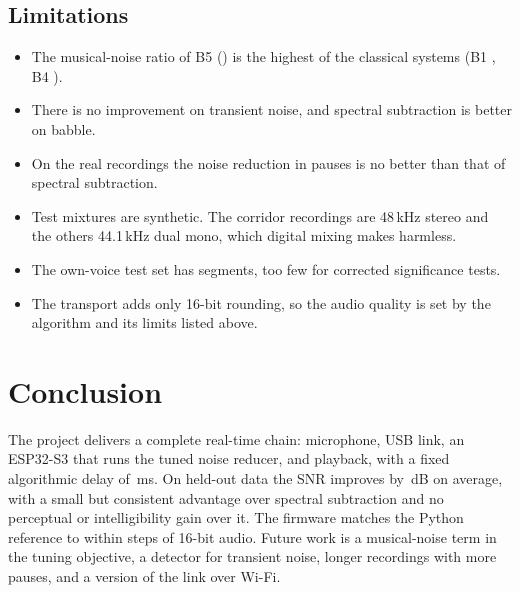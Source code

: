 \documentclass[11pt,a4paper]{article}
\numberwithin{figure}{section}
\numberwithin{table}{section}
\numberwithin{equation}{section}
\newcommand{\dB}{\,dB}
\begin{document}
\begin{table}[htbp]
\centering
\small

\caption{Firmware against the Python engine, in steps of 16-bit audio (one step is $3.05\times10^{-5}$ of full scale).}
\label{tab:firmware}
\end{table}

\subsection{Limitations}
\begin{itemize}
\item The musical-noise ratio of B5 (\valMnrBfive) is the highest of the classical systems (B1 \valMnrBone, B4 \valMnrBfour).
\item There is no improvement on transient noise, and spectral subtraction is better on babble.
\item On the real recordings the noise reduction in pauses is no better than that of spectral subtraction.
\item Test mixtures are synthetic. The corridor recordings are 48\,kHz stereo and the others 44.1\,kHz dual mono, which digital mixing makes harmless.
\item The own-voice test set has \valNOwn{} segments, too few for corrected significance tests.
\item The transport adds only 16-bit rounding, so the audio quality is set by the algorithm and its limits listed above.
\end{itemize}

\section{Conclusion}
The project delivers a complete real-time chain: microphone, USB link, an ESP32-S3 that runs the tuned noise reducer, and playback,
with a fixed algorithmic delay of \valDelayMs\,ms. On held-out data the SNR improves by \valDsnrBfive\dB{} on average, with a small
but consistent advantage over spectral subtraction and no perceptual or intelligibility gain over it. The firmware matches the
Python reference to within \valFwMaxSteps{} steps of 16-bit audio. Future work is a musical-noise term in the tuning objective,
a detector for transient noise, longer recordings with more pauses, and a version of the link over Wi-Fi.

\end{document}
